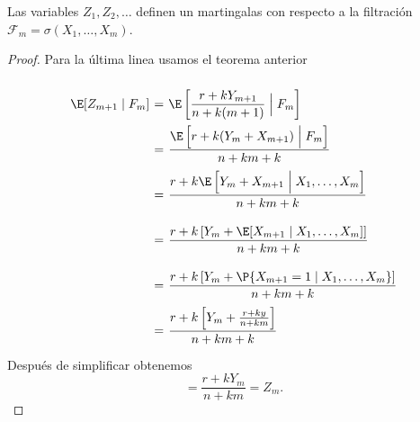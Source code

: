\begin{theorem}
    Las variables $Z_1,Z_2,\ldots$ definen un martingalas con respecto a la filtración $\mathscr{F}_m = \sigma(X_1,\ldots, X_m)$.
\end{theorem}
\begin{proof} Para la última linea usamos el teorema anterior
    \[ \everymath{\displaystyle}
    \arraycolsep=1.8pt\def\arraystretch{3}
    \begin{array}{rcl}
        \E [Z_{m+1} \;|\; F_m] & = & \E \left[ \frac{r+k Y_{m+1}}{n+k(m+1)} \;\Big|\; F_m \right]\\
        & = & \frac{ \E\left[r+k (Y_{m}+ X_{m+1})\;\Big|\; F_m \right]}{n+km+k}\\
        & = & \frac{ r+k\E\left[Y_{m}+ X_{m+1}\;\Big|\; X_1,\ldots,X_m \right]}{n+km+k}\\
        & = & \frac{ r+k\left[Y_{m}+\E [X_{m+1}\;|\; X_1,\ldots,X_m] \right]}{n+km+k}\\
        & = & \frac{ r+k\left[Y_{m}+\P \{X_{m+1} = 1\;|\; X_1,\ldots,X_m\} \right]}{n+km+k}\\
        & = & \frac{ r+k\left[Y_{m}+ \frac{r+ky}{n+km} \right]}{n+km+k}\\
    \end{array} \]
    Después de simplificar obtenemos
    \[  = \frac{r+kY_m}{n+km} = Z_m. \]
\end{proof}